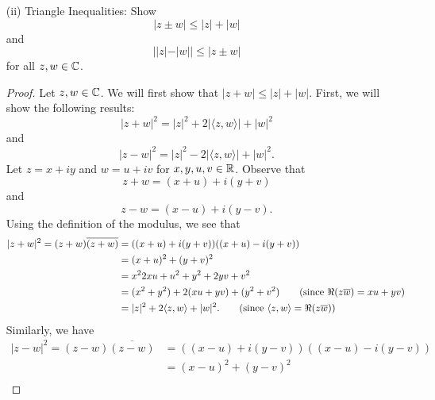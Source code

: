 \documentclass[a4paper]{article}
\begin{document}
\begin{enumerate}
\begin{proof}
    \begin{align*}
       | \langle z , w \rangle |^{2}   &\leq | \langle z , w \rangle |^{2} + | \langle iz , w \rangle |^{2}  
                                       = | z |^{2} | w |^{2} 
    \end{align*}
    and we are done.
                \end{proof}
            \item[(ii)] Triangle Inequalities: Show 
                \[  | z \pm w  | \leq | z  |  + | w  | \]
                and 
                \[  | | z  |  - | w |  | \leq | z \pm w  |  \]
                for all \( z,w \in \mathbb{C}  \).
                \begin{proof}
                Let \( z,w \in \mathbb{C}  \). We will first show that \(  | z + w  | \leq | z  |  + | w |  \). First, we will show the following results:
                \[  | z + w  |^{2} = | z |^{2} + 2 | \langle z , w \rangle | + | w |^{2} \tag{1} \]
                and 
                \[  | z - w  |^{2} = | z |^{2} - 2 | \langle z , w \rangle | + | w |^{2}. \tag{2}  \]
                Let \( z = x + iy \) and \( w = u + i v  \) for \( x,y,u,v \in \mathbb{R}  \). Observe that   
                \[  z + w = (x+u) + i(y +v) \]
                and 
                \[  z - w = (x-u) + i(y - v). \]
                Using the definition of the modulus, we see that
                \begin{align*}
                    | z + w  |^{2} = (z+w) \overline{(z+w)} &= ((x+u) + i(y+v)) ((x+u) - i(y+v)) \\
                                                            &= (x+u)^{2} + (y +v)^{2} \\
                                                            &= x^{2} 2xu + u^{2} + y^{2} + 2yv + v^{2} \\
                                                            &= (x^{2} + y^{2}) + 2 (xu + yv) + (y^{2} + v^{2}) \tag{since \( \Re(z \overline{w}) = xu + yv \)} \\
                                                            &= | z |^{2} + 2 \langle z , w \rangle + | w |^{2}. \tag{since \( \langle z , w \rangle = \Re(z \overline{w}) \)}
                \end{align*} 
                Similarly, we have
                \begin{align*}
                    | z - w  |^{2} = (z-w)\overline{(z-w)} &= ((x-u) + i (y - v)) ((x-u) - i (y - v)) \\
                                                           &= (x-u)^{2} + (y - v)^{2} \\

\end{align*}
\end{proof}
\end{enumerate}
\end{document}

